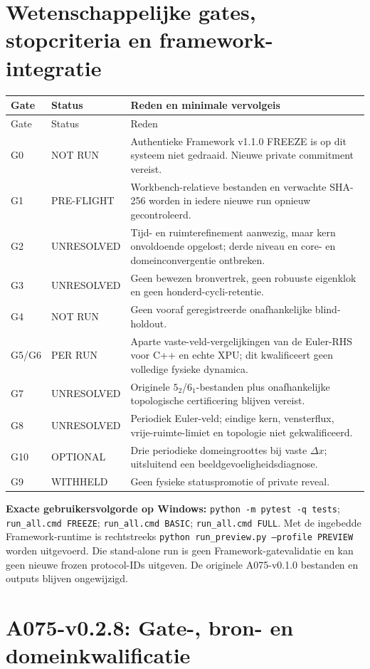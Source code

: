 \documentclass[10pt,a4paper]{article}
\begin{document}
\section{Wetenschappelijke gates, stopcriteria en framework-integratie}
\begin{longtable}{@{}p{12mm}p{25mm}p{109mm}@{}}\toprule
Gate & Status & Reden en minimale vervolgeis\\\midrule\endfirsthead\toprule Gate & Status & Reden\\\midrule\endhead
G0 & NOT RUN & Authentieke Framework v1.1.0 FREEZE is op dit systeem niet gedraaid. Nieuwe private commitment vereist.\\
G1 & PRE-FLIGHT & Workbench-relatieve bestanden en verwachte SHA-256 worden in iedere nieuwe run opnieuw gecontroleerd.\\
G2 & UNRESOLVED & Tijd- en ruimterefinement aanwezig, maar kern onvoldoende opgelost; derde niveau en core- en domeinconvergentie ontbreken.\\
G3 & UNRESOLVED & Geen bewezen bronvertrek, geen robuuste eigenklok en geen honderd-cycli-retentie.\\
G4 & NOT RUN & Geen vooraf geregistreerde onafhankelijke blind-holdout.\\
G5/G6 & PER RUN & Aparte vaste-veld-vergelijkingen van de Euler-RHS voor C++ en echte XPU; dit kwalificeert geen volledige fysieke dynamica.\\
G7 & UNRESOLVED & Originele $5_2$/$6_1$-bestanden plus onafhankelijke topologische certificering blijven vereist.\\
G8 & UNRESOLVED & Periodiek Euler-veld; eindige kern, vensterflux, vrije-ruimte-limiet en topologie niet gekwalificeerd.\\
G10 & OPTIONAL & Drie periodieke domeingroottes bij vaste $\Delta x$; uitsluitend een beeldgevoeligheidsdiagnose.\\
G9 & WITHHELD & Geen fysieke statuspromotie of private reveal.\\\bottomrule\end{longtable}
\noindent\textbf{Exacte gebruikersvolgorde op Windows:} \texttt{python -m pytest -q tests}; \texttt{run\_all.cmd FREEZE}; \texttt{run\_all.cmd BASIC}; \texttt{run\_all.cmd FULL}. Met de ingebedde Framework-runtime is rechtstreeks \texttt{python run\_preview.py --profile PREVIEW} worden uitgevoerd. Die stand-alone run is geen Framework-gatevalidatie en kan geen nieuwe frozen protocol-IDs uitgeven. De originele A075-v0.1.0 bestanden en outputs blijven ongewijzigd.
\section{A075-v0.2.8: Gate-, bron- en domeinkwalificatie}
\end{document}
